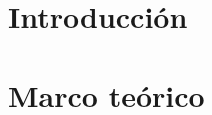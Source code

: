 \documentclass[a4paper, twoside]{report}
\begin{document}


% 
 
 
 
\tableofcontents


\chapter{Introducción}

\chapter{Marco teórico}


\printbibliography
\end{document}
